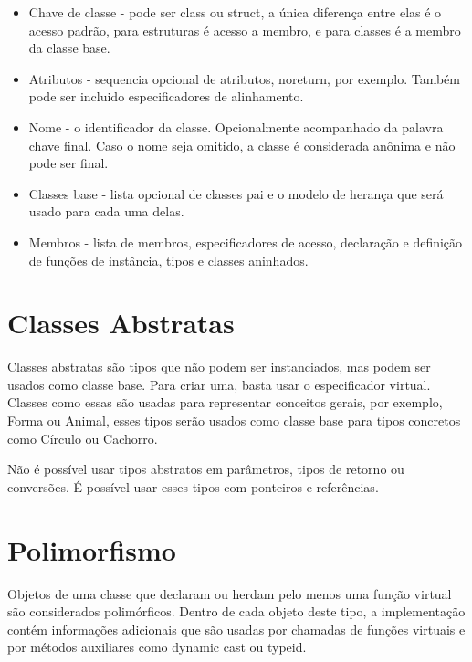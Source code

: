 \documentclass[rel_mlp]{iiufrgs}
\begin{document}
\begin{itemize}
	\item Chave de classe - pode ser class ou struct, a única diferença entre elas é o acesso padrão, para estruturas é acesso a membro, e para classes é a membro da classe base.
	\item Atributos - sequencia opcional de atributos, noreturn, por exemplo. Também pode ser incluido especificadores de alinhamento.
	\item Nome - o identificador da classe. Opcionalmente acompanhado da palavra chave final. Caso o nome seja omitido, a classe é considerada anônima e não pode ser final.
	\item Classes base -  lista opcional de classes pai e o modelo de herança que será usado para cada uma delas.
	\item Membros - lista de membros, especificadores de acesso, declaração e definição de funções de instância, tipos e classes aninhados.
\end{itemize}

\section{Classes Abstratas}
Classes abstratas são tipos que não podem ser instanciados, mas podem ser usados como classe base. Para criar uma, basta usar o especificador virtual. Classes como essas são usadas para representar conceitos gerais, por exemplo, Forma ou Animal, esses tipos serão usados como classe base para tipos concretos como Círculo ou Cachorro. 

Não é possível usar tipos abstratos em parâmetros, tipos de retorno ou conversões. É possível usar esses tipos com ponteiros e referências.


\section{Polimorfismo}
Objetos de uma classe que declaram ou herdam pelo menos uma função virtual são considerados polimórficos. Dentro de cada objeto deste tipo, a implementação contém informações adicionais que são usadas por chamadas de funções virtuais e por métodos auxiliares como dynamic cast ou typeid.
\end{document}
